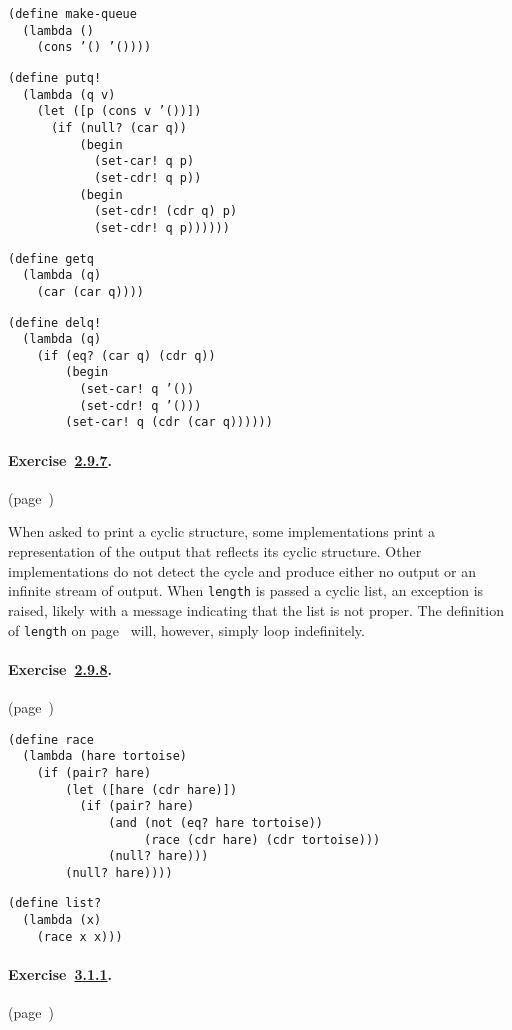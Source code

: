   
\begin{alltt}
 (define make-queue
   (lambda ()
     (cons '() '()))) 

(define putq!
   (lambda (q v)
     (let ([p (cons v '())])
       (if (null? (car q))
           (begin
             (set-car! q p)
             (set-cdr! q p))
           (begin
             (set-cdr! (cdr q) p)
             (set-cdr! q p)))))) 

(define getq
   (lambda (q)
     (car (car q)))) 

(define delq!
   (lambda (q)
     (if (eq? (car q) (cdr q))
         (begin
           (set-car! q '())
           (set-cdr! q '()))
         (set-car! q (cdr (car q))))))
\end{alltt}



\paragraph{Exercise \hyperref[start_g47]{2.9.7}. }(page \pageref{start_s196})

  When asked to print a cyclic structure, some implementations print a representation of the output that reflects its cyclic structure. Other implementations do not detect the cycle and produce either no output or an infinite stream of output. When \texttt{length} is passed a cyclic list, an exception is raised, likely with a message indicating that the list is not proper. The definition of \texttt{length} on page \pageref{start_defn_simplelength} will, however, simply loop indefinitely. 


\paragraph{Exercise \hyperref[start_g48]{2.9.8}. }(page \pageref{start_s199})

  
\begin{alltt}
 (define race
   (lambda (hare tortoise)
     (if (pair? hare)
         (let ([hare (cdr hare)])
           (if (pair? hare)
               (and (not (eq? hare tortoise))
                    (race (cdr hare) (cdr tortoise)))
               (null? hare)))
         (null? hare)))) 

(define list?
   (lambda (x)
     (race x x)))
\end{alltt}



\paragraph{Exercise \hyperref[further_g51]{3.1.1}. }(page \pageref{further_s25})

